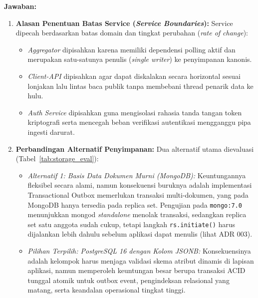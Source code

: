 \textbf{Jawaban:}
\begin{enumerate}
    \item \textbf{Alasan Penentuan Batas Service (\textit{Service Boundaries}):}
    Service dipecah berdasarkan batas domain dan tingkat perubahan (\textit{rate of change}):
    \begin{itemize}
        \item \textit{Aggregator} dipisahkan karena memiliki dependensi polling aktif dan merupakan satu-satunya penulis (\textit{single writer}) ke penyimpanan kanonis.
        \item \textit{Client-API} dipisahkan agar dapat diskalakan secara horizontal sesuai lonjakan lalu lintas baca publik tanpa membebani thread penarik data ke hulu.
        \item \textit{Auth Service} dipisahkan guna mengisolasi rahasia tanda tangan token kriptografi serta mencegah beban verifikasi autentikasi mengganggu pipa ingesti darurat.
    \end{itemize}
    \item \textbf{Perbandingan Alternatif Penyimpanan:}
    Dua alternatif utama dievaluasi (Tabel~\ref{tab:storage_eval}):
    \begin{itemize}
        \item \textit{Alternatif 1: Basis Data Dokumen Murni (MongoDB):} Keuntungannya fleksibel secara alami, namun konsekuensi buruknya adalah implementasi Transactional Outbox memerlukan transaksi \mbox{multi-dokumen}, yang pada MongoDB hanya tersedia pada replica set. Pengujian pada \texttt{mongo:7.0} menunjukkan mongod \textit{standalone} menolak transaksi, sedangkan replica set satu anggota sudah cukup, tetapi langkah \texttt{rs.initiate()} harus dijalankan lebih dahulu sebelum aplikasi dapat menulis (lihat ADR 003).
        \item \textit{Pilihan Terpilih: PostgreSQL 16 dengan Kolom JSONB:} Konsekuensinya adalah kelompok harus menjaga validasi skema atribut dinamis di lapisan aplikasi, namun memperoleh keuntungan besar berupa transaksi ACID tunggal atomik untuk outbox event, pengindeksan relasional yang matang, serta keandalan operasional tingkat tinggi.
    \end{itemize}
\end{enumerate}
